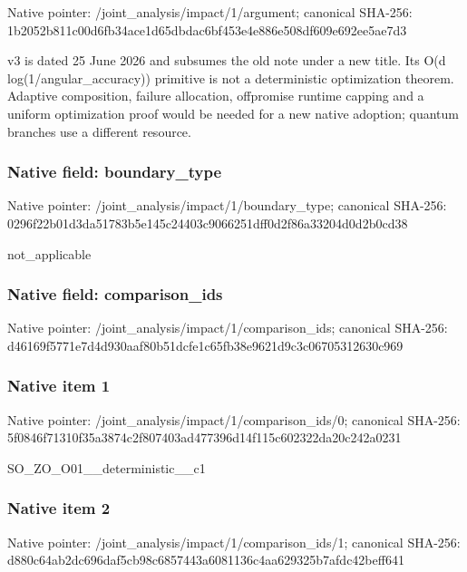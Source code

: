 \documentclass[10pt,a4paper]{article}
\begin{document}
Native pointer: /joint\_analysis/impact/1/argument; canonical SHA-256: 1b2052b811c00d6fb34ace1d\allowbreak{}65dbdac6bf453e4e886e508d\allowbreak{}f609e692ee5ae7d3


v3 is dated 25 June 2026 and subsumes the old note under a new title. Its O(d log(1/angular\_accuracy)) primitive is not a deterministic optimization theorem. Adaptive composition, failure allocation, offpromise runtime capping and a uniform optimization proof would be needed for a new native adoption; quantum branches use a different resource.


\subsubsection{Native field: boundary\_type}


Native pointer: /joint\_analysis/impact/1/boundary\_type; canonical SHA-256: 0296f22b01d3da51783b5e14\allowbreak{}5c24403c9066251dff0d2f86\allowbreak{}a33204d0d2b0cd38


not\_applicable


\subsubsection{Native field: comparison\_ids}


Native pointer: /joint\_analysis/impact/1/comparison\_ids; canonical SHA-256: d46169f5771e7d4d930aaf80\allowbreak{}b51dcfe1c65fb38e9621d9c3\allowbreak{}c06705312630c969



\subsubsection{Native item 1}


Native pointer: /joint\_analysis/impact/1\allowbreak{}/comparison\_ids/0; canonical SHA-256: 5f0846f71310f35a3874c2f8\allowbreak{}07403ad477396d14f115c602\allowbreak{}322da20c242a0231


SO\_ZO\_O01\_\_deterministic\_\_c1


\subsubsection{Native item 2}


Native pointer: /joint\_analysis/impact/1\allowbreak{}/comparison\_ids/1; canonical SHA-256: d880c64ab2dc696daf5cb98c\allowbreak{}6857443a6081136c4aa62932\allowbreak{}5b7afdc42beff641
\end{document}

